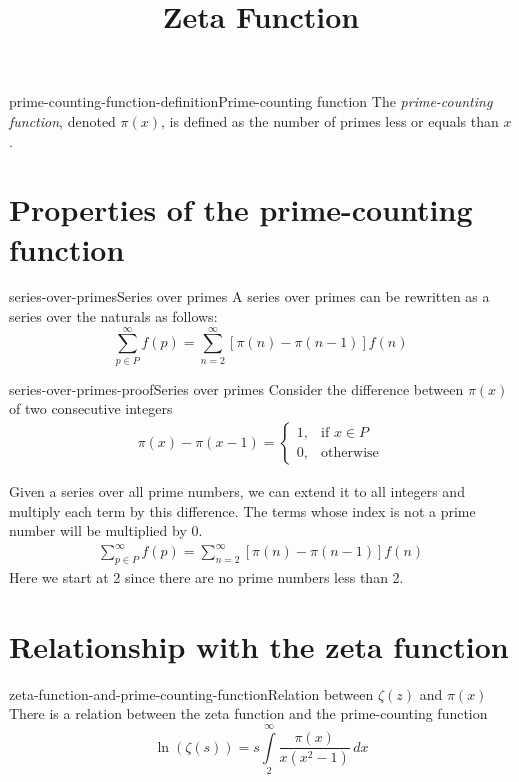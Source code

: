 \documentclass[preview]{standalone}
\begin{document}
\title{Zeta Function}
\genpage

\begin{snippetdefinition}{prime-counting-function-definition}{Prime-counting function}
    The \textit{prime-counting function}, denoted \(\pi(x)\),
    is defined as the number of primes less or equals than \(x\).
\end{snippetdefinition}

\section{Properties of the prime-counting function}

\begin{snippetproposition}{series-over-primes}{Series over primes}
    A series over primes can be rewritten as a series over the naturals as follows:
    \[
        \sum_{p\in P}^{\infty}f(p)=\sum_{n=2}^{\infty}\left[\pi(n)-\pi(n-1)\right]f(n)
    \]
\end{snippetproposition}

\begin{snippetproof}{series-over-primes-proof}{Series over primes}
    Consider the difference between \(\pi(x)\) of two consecutive integers
    \begin{align*}
        \pi (x)-\pi (x-1)= 
        \begin{cases}
            1,& \text{if } x\in P
            \\
            0,& \text{otherwise}
        \end{cases}
    \end{align*}

    Given a series over all prime numbers, we can extend it to all integers and multiply each term by this difference.
    The terms whose index is not a prime number will be multiplied by 0.
    \begin{align*}
        \sum_{p\in P}^{\infty}f(p)=\sum_{n=2}^{\infty}\left[\pi(n)-\pi(n-1)\right]f(n)
    \end{align*}
    Here we start at 2 since there are no prime numbers less than 2.
\end{snippetproof}

\section{Relationship with the zeta function}

\begin{snippettheorem}{zeta-function-and-prime-counting-function}{Relation between \(\zeta(z)\) and \(\pi(x)\)}
    There is a relation between the zeta function and the prime-counting function
    \[
        \ln\left(\zeta(s)\right)=
        s\int\limits_2^\infty
        \frac{\pi(x)}{x(x^2-1)}\,dx
    \]
\end{snippettheorem}
\end{document}
